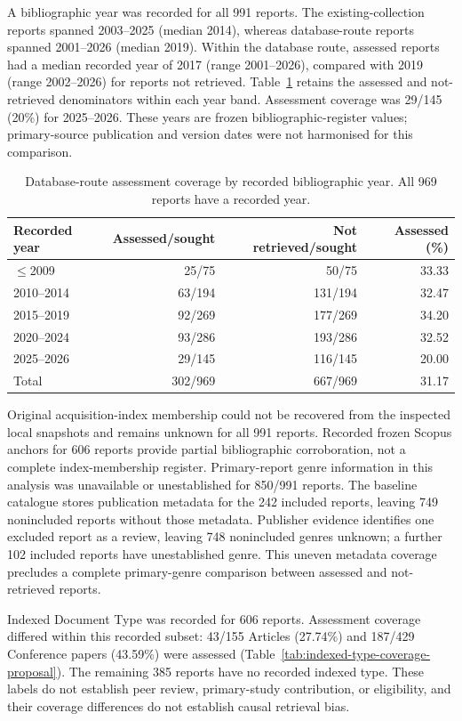 \documentclass[manuscript,review,screen]{acmart}
\begin{document}
A bibliographic year was recorded for all 991 reports. The existing-collection reports spanned 2003--2025 (median 2014), whereas database-route reports spanned 2001--2026 (median 2019). Within the database route, assessed reports had a median recorded year of 2017 (range 2001--2026), compared with 2019 (range 2002--2026) for reports not retrieved. Table~\ref{tab:retrieval-coverage-proposal} retains the assessed and not-retrieved denominators within each year band. Assessment coverage was 29/145 (20\%) for 2025--2026. These years are frozen bibliographic-register values; primary-source publication and version dates were not harmonised for this comparison.

\begin{table}[htbp]
\centering
\caption{Database-route assessment coverage by recorded bibliographic year. All 969 reports have a recorded year.}
\label{tab:retrieval-coverage-proposal}
\begin{tabular}{lrrr}
\hline
Recorded year & Assessed/sought & Not retrieved/sought & Assessed (\%) \\
\hline
$\leq$2009 & 25/75 & 50/75 & 33.33 \\
2010--2014 & 63/194 & 131/194 & 32.47 \\
2015--2019 & 92/269 & 177/269 & 34.20 \\
2020--2024 & 93/286 & 193/286 & 32.52 \\
2025--2026 & 29/145 & 116/145 & 20.00 \\
Total & 302/969 & 667/969 & 31.17 \\
\hline
\end{tabular}
\end{table}

Original acquisition-index membership could not be recovered from the inspected local snapshots and remains unknown for all 991 reports. Recorded frozen Scopus anchors for 606 reports provide partial bibliographic corroboration, not a complete index-membership register. Primary-report genre information in this analysis was unavailable or unestablished for 850/991 reports. The baseline catalogue stores publication metadata for the 242 included reports, leaving 749 nonincluded reports without those metadata. Publisher evidence identifies one excluded report as a review, leaving 748 nonincluded genres unknown; a further 102 included reports have unestablished genre. This uneven metadata coverage precludes a complete primary-genre comparison between assessed and not-retrieved reports.


Indexed Document Type was recorded for 606 reports. Assessment coverage differed within this recorded subset: 43/155 Articles (27.74\%) and 187/429 Conference papers (43.59\%) were assessed (Table~\ref{tab:indexed-type-coverage-proposal}). The remaining 385 reports have no recorded indexed type. These labels do not establish peer review, primary-study contribution, or eligibility, and their coverage differences do not establish causal retrieval bias.
\end{document}
